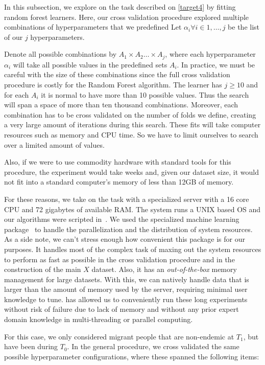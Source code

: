 In this subsection, we explore on the task described on \cref{target4} by fitting random forest learners.
Here, our cross validation procedure explored multiple combinations of hyperparameters that we predefined Let $\alpha_i \forall i \in {1,\ldots,j}$ be the list of our $j$ hyperparameters.

Denote all possible combinations by $A_1 \times A_2 \ldots \times  A_j$, where each hyperparameter $\alpha_i$ will take all possible values in the predefined sets $A_i$.
In practice, we must be careful with the size of these combinations since the full cross validation procedure is costly for the Random Forest algorithm.
The learner has $j \geq 10$ and for each $A_i$ it is normal to have more than 10 possible values.
Thus the search will span a space of more than ten thousand combinations.
Moreover, each combination has to be cross validated on the number of folds we define, creating a very large amount of iterations during this search.
These fits will take computer resources such as memory and CPU time.
So we have to limit ourselves to search over a limited amount of values.

Also, if we were to use commodity hardware with standard tools for this procedure, the experiment would take weeks and, given our dataset size, it would not fit into a standard computer's memory of less than 12GB of memory.

For these reasons, we take on the task with a specialized server with a 16 core CPU and 72 gigabytes of available RAM.\@
The system runs a UNIX based OS and our algorithms were scripted in~\cite{python3.5}.
We used the specialized machine learning package~\cite{graphlab} to handle the parallelization and the distribution of system resources.
As a side note, we can't stress enough how convenient this package is for our purposes.
It handles most of the complex task of maxing out the system resources to perform as fast as possible in the cross validation procedure and in the construction of the main $X$ dataset.
Also, it has an \textit{out-of-the-box} memory management for large datasets.
With this, we can natively handle data that is larger than the amount of memory used by the server, requiring minimal user knowledge to tune.
\cite{graphlab} has allowed us to conveniently run these long experiments without risk of failure due to lack of memory and without any prior expert domain knowledge in multi-threading or parallel computing.

For this case, we only considered migrant people that are non-endemic at $T_1$, but have been during $T_0$.
In the general procedure, we cross validated the same possible hyperparameter configurations, where these spanned the following items:

